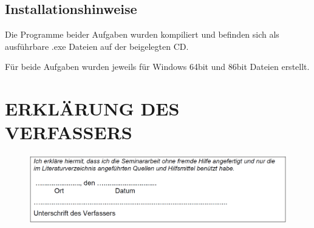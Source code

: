 \documentclass[a4paper,12pt]{article}
\begin{document}
\subsection{Installationshinweise}
Die Programme beider Aufgaben wurden kompiliert und befinden sich als ausführbare .exe Dateien auf der beigelegten CD.

Für beide Aufgaben wurden jeweils für Windows 64bit und 86bit Dateien erstellt.


\newpage
{}
\section{ERKLÄRUNG DES VERFASSERS}

\begin{figure}[H]
    \includegraphics[width=\linewidth]{Bilder/Sonstiges/ErklaerungDesVerfassers.png}
\end{figure}
\end{document}
